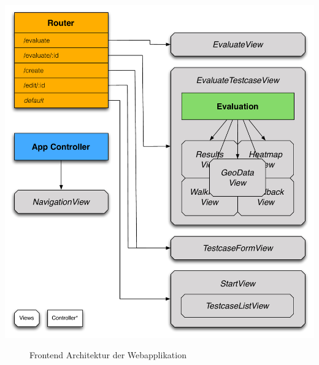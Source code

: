 \begin{center}
\includegraphics[scale=0.55]{./images/architecture}
\end{center}
\begin{figure}[htb]
   \centering
   \caption{Frontend Architektur der Webapplikation}
    \label{webappview}
\end{figure}

